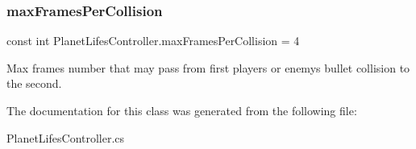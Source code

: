 \subsubsection{\texorpdfstring{max\+Frames\+Per\+Collision}{maxFramesPerCollision}}
{\footnotesize\ttfamily const int Planet\+Lifes\+Controller.\+max\+Frames\+Per\+Collision = 4\hspace{0.3cm}{\ttfamily [private]}}



Max frames number that may pass from first player\textquotesingle{}s or enemy\textquotesingle{}s bullet collision to the second. 



The documentation for this class was generated from the following file\+:\begin{DoxyCompactItemize}
\item 
Planet\+Lifes\+Controller.\+cs\end{DoxyCompactItemize}
